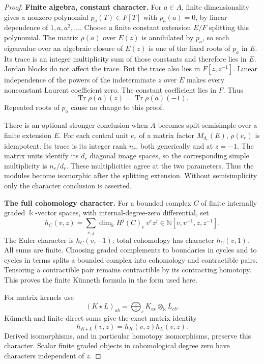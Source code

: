 \begin{proof}
\par\smallskip\noindent\textbf{Finite algebra, constant character.}\quad
For \(a\in A\), finite dimensionality gives a nonzero polynomial
\(p_a(T)\in F[T]\) with \(p_a(a)=0\), by linear dependence of
\(1,a,a^2,\ldots\).
Choose a finite constant extension \(E/F\) splitting this polynomial.
The matrix \(\rho(a)\) over \(E(z)\) is annihilated by \(p_a\),
so each eigenvalue over an algebraic closure of \(E(z)\) is one of
the fixed roots of \(p_a\) in \(E\).
Its trace is an integer multiplicity sum of those constants and
therefore lies in \(E\). Jordan blocks do not affect the trace.
But the trace also lies in \(F[z,z^{-1}]\).
Linear independence of the powers of the indeterminate \(z\)
over \(E\) makes every nonconstant Laurent coefficient zero.
The constant coefficient lies in \(F\). Thus
\begin{equation}\label{eq:finitealgebracharconstant}
\operatorname{Tr}\rho(a)(z)=\operatorname{Tr}\rho(a)(-1).
\end{equation}
Repeated roots of \(p_a\) cause no change to this proof.

There is an optional stronger conclusion when \(A\) becomes
split semisimple over a finite extension \(E\).
For each central unit \(e_r\) of a matrix factor \(M_{d_r}(E)\),
\(\rho(e_r)\) is idempotent. Its trace is its integer rank
\(n_r\), both generically and at \(z=-1\).
The matrix units identify its \(d_r\) diagonal image spaces,
so the corresponding simple multiplicity is \(n_r/d_r\).
These multiplicities agree at the two parameters.
Thus the modules become isomorphic after the splitting extension.
Without semisimplicity only the character conclusion is asserted.

\par\smallskip\noindent\textbf{The full cohomology character.}\quad
For a bounded complex \(C\) of finite internally graded
\(\Bbbk\)-vector spaces, with internal-degree-zero differential, set
\[
h_C(v,z)=\sum_{e,j}\dim_{\Bbbk}H^j(C)_e\,v^ez^j
\in\mathbb N[v,v^{-1},z,z^{-1}].
\]
The Euler character is \(h_C(v,-1)\); total cohomology has
character \(h_C(v,1)\).
All sums are finite.
Choosing graded complements to boundaries in cycles and to
cycles in terms splits a bounded complex into cohomology and
contractible pairs. Tensoring a contractible pair remains
contractible by its contracting homotopy. This proves the finite
K\"unneth formula in the form used here.

For matrix kernels use
\[
(K\star L)_{ab}=\bigoplus_c K_{ac}\otimes_{\Bbbk}L_{cb}.
\]
K\"unneth and finite direct sums give the exact matrix identity
\begin{equation}\label{eq:kernelPoincareproduct}
h_{K\star L}(v,z)=h_K(v,z)h_L(v,z).
\end{equation}
Derived isomorphisms, and in particular homotopy isomorphisms,
preserve this character.
Scalar finite graded objects in cohomological degree zero
have characters independent of \(z\).


\end{proof}
